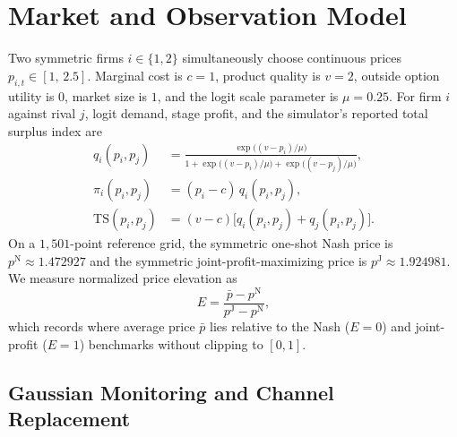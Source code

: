 \documentclass{article}
\begin{document}
\section{Market and Observation Model}

Two symmetric firms $i\in\{1,2\}$ simultaneously choose continuous prices $p_{i,t}\in[1,\,2.5]$. Marginal cost is $c=1$, product quality is $v=2$, outside option utility is $0$, market size is $1$, and the logit scale parameter is $\mu=0.25$. For firm $i$ against rival $j$, logit demand, stage profit, and the simulator's reported total surplus index are
\begin{align}
q_i(p_i,p_j) &= \frac{\exp\!\bigl((v-p_i)/\mu\bigr)}
{1+\exp\!\bigl((v-p_i)/\mu\bigr)+\exp\!\bigl((v-p_j)/\mu\bigr)},\\[3pt]
\pi_i(p_i,p_j) &= (p_i - c)\,q_i(p_i,p_j),\\[3pt]
\mathrm{TS}(p_i,p_j) &= (v-c)\bigl[q_i(p_i,p_j)+q_j(p_i,p_j)\bigr].
\end{align}
On a $1{,}501$-point reference grid, the symmetric one-shot Nash price is $p^{\mathrm{N}}\approx 1.472927$ and the symmetric joint-profit-maximizing price is $p^{\mathrm{J}}\approx 1.924981$. We measure normalized price elevation as
\[
E = \frac{\bar{p}-p^{\mathrm{N}}}{p^{\mathrm{J}}-p^{\mathrm{N}}},
\]
which records where average price $\bar{p}$ lies relative to the Nash ($E=0$) and joint-profit ($E=1$) benchmarks without clipping to $[0,1]$.

\subsection{Gaussian Monitoring and Channel Replacement}
\end{document}
